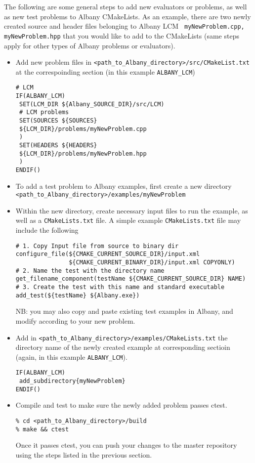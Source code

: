 \documentclass[pdf,12pt,report,strict]{SANDreport}
\theoremstyle{remark}
\begin{document}
The following are some general steps to add new evaluators or problems, as well as new test problems to Albany CMakeLists. As an example, there are two newly created source and header files belonging to Albany LCM \verb+ myNewProblem.cpp, myNewProblem.hpp+ that you would like to add to the CMakeLists (same steps apply for other types of Albany problems or evaluators). 
\begin{itemize}
\item Add new problem files in \verb+<path_to_Albany_directory>/src/CMakeList.txt+ at the correspoinding section (in this example \verb+ALBANY_LCM+)
\begin{verbatim}
# LCM
IF(ALBANY_LCM)
 SET(LCM_DIR ${Albany_SOURCE_DIR}/src/LCM)
 # LCM problems
 SET(SOURCES ${SOURCES}
 ${LCM_DIR}/problems/myNewProblem.cpp
 )
 SET(HEADERS ${HEADERS}
 ${LCM_DIR}/problems/myNewProblem.hpp
 )
ENDIF()
\end{verbatim}

\item To add a test problem to Albany examples, first create a new directory \verb+<path_to_Albany_directory>/examples/myNewProblem+

\item Within the new directory, create necessary input files to run the example, as well as a \verb+CMakeLists.txt+ file. A simple example \verb+CMakeLists.txt+ file may include the following 
\begin{verbatim}
# 1. Copy Input file from source to binary dir
configure_file(${CMAKE_CURRENT_SOURCE_DIR}/input.xml
               ${CMAKE_CURRENT_BINARY_DIR}/input.xml COPYONLY)
# 2. Name the test with the directory name
get_filename_component(testName ${CMAKE_CURRENT_SOURCE_DIR} NAME)
# 3. Create the test with this name and standard executable
add_test(${testName} ${Albany.exe})
\end{verbatim}
NB: you may also copy and paste existing test examples in Albany, and modify according to your new problem. 

\item Add in \verb+<path_to_Albany_directory>/examples/CMakeLists.txt+ the directory name of the newly created example at corresponding sectioin (again, in this example \verb+ALBANY_LCM+). 
\begin{verbatim}
IF(ALBANY_LCM)
 add_subdirectory{myNewProblem}  
ENDIF()
\end{verbatim}

\item Compile and test to make sure the newly added problem passes ctest. 
\begin{verbatim}
% cd <path_to_Albany_directory>/build
% make && ctest
\end{verbatim}
Once it passes ctest, you can push your changes to the master repository using the steps listed in the previous section.
\end{itemize}
\end{document}
